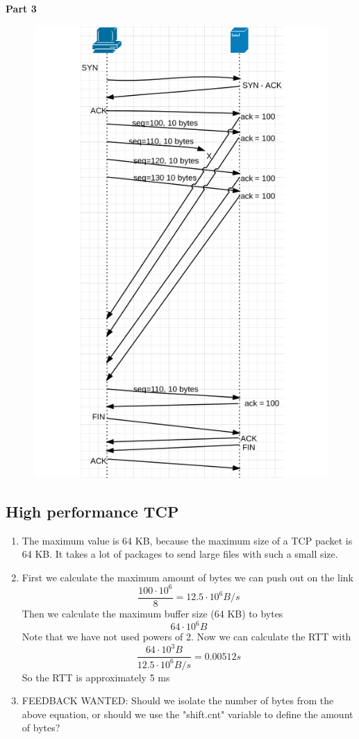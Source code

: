 \noindent \textbf{Part 3}
\begin{figure}[h!]
  \includegraphics[scale=0.5]{tcpstuff.png}
\end{figure}
\newpage
\subsection{High performance TCP}
\begin{enumerate}
\item The maximum value is 64 KB, because the maximum size of a TCP packet is
    64 KB. It takes a lot of packages to send large files with such a small
    size.
\item First we calculate the maximum amount of bytes we can push out on the
    link
    \[
        \frac{100\cdot 10^6}{8} = 12.5 \cdot 10^6 B/s
    \]
    Then we calculate the maximum buffer size (64 KB) to bytes
    \[
        64 \cdot 10^6 B
    \]
    Note that we have not used powers of 2. Now we can calculate the RTT with
    \[
        \frac{64 \cdot 10^3 B}{12.5 \cdot 10^6 B/s} = 0.00512 s
    \]
    So the RTT is approximately 5 ms
\item FEEDBACK WANTED: Should we isolate the number of bytes from the above
    equation, or should we use the "shift.cnt" variable to define the amount of bytes?
\end{enumerate}

